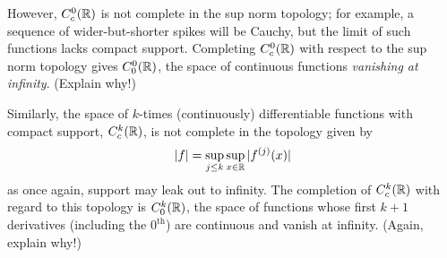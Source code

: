     However, $C^0_c(\mathbb{R})$ is not complete in the sup norm topology; for example, a sequence of wider-but-shorter spikes will be Cauchy, but the limit of such functions lacks compact support. %
    Completing $C^0_c(\mathbb{R})$ with respect to the sup norm topology gives $C_0^0(\mathbb{R})$, the space of continuous functions \emph{vanishing at infinity}. (Explain why!) %

    Similarly, the space of $k$-times (continuously) differentiable functions with compact support, $C_c^k(\mathbb{R})$, is not complete in the topology given by
    \begin{equation*}
      |f| = \sup_{j\le k} \sup_{x\in\mathbb{R}} |f^{(j)}(x)|
    \end{equation*}
    as once again, support may leak out to infinity.
    The completion of $C_c^k(\mathbb{R})$ with regard to this topology is $C_0^k(\mathbb{R})$, the space of functions whose first $k+1$ derivatives (including the $0^\text{th}$) are continuous and vanish at infinity. (Again, explain why!) %

